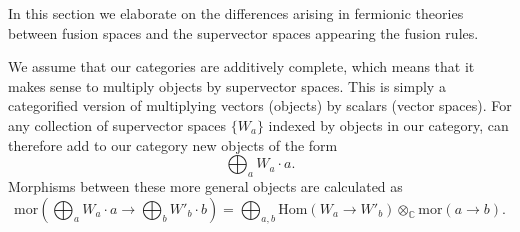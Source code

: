 \documentclass[12pt,a4paper]{article}
\newcommand{\tp}{\otimes}
\newcommand{\cc}{\mathbb{C}}
\newcommand\be            {\begin{equation}}
\newcommand\ee            {\end{equation}}
\newcommand{\Hom}{\text{Hom}}
\newcommand{\mor}{\text{mor}}
\newcommand{\End}{\text{End}}
\newcommand{\kw}[1]{{\color{kwcolor}\footnotesize{(KW) #1}}}
\newcommand{\dave}[1]{{\color{ao(english)}\footnotesize{(DA) #1}}}
\begin{document}

In this section we elaborate on the differences arising in fermionic theories between fusion spaces and the supervector spaces appearing the fusion rules. 

We assume that our categories are additively complete, which means that it makes sense to
multiply objects by supervector spaces. 
This is simply a categorified version of multiplying vectors (objects) by scalars (vector spaces).
For any collection of supervector spaces $\{W_a\}$ indexed by objects in our category, can therefore add to our category new objects of the form
\be \bigoplus_a W_a \cdot a.\ee
Morphisms between these more general objects are calculated as  
\be
	\mor(\bigoplus_a W_a\cdot a \to \bigoplus_b W'_b\cdot b) = \bigoplus_{a,b} \Hom(W_a \to W'_b)\otimes_\cc \mor(a\to b) .
\ee
\end{document}
